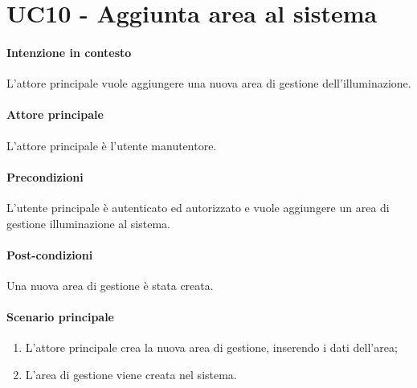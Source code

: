 \section{UC10 - Aggiunta area al sistema}\label{uc:10}
\paragraph{Intenzione in contesto} L'attore principale vuole aggiungere una nuova area di gestione dell'illuminazione.

\paragraph{Attore principale} L'attore principale è l'utente manutentore.

\paragraph{Precondizioni}
L'utente principale è autenticato ed autorizzato e vuole aggiungere un area di gestione illuminazione al sistema.

\paragraph{Post-condizioni}
Una nuova area di gestione è stata creata.

\paragraph{Scenario principale}
\begin{enumerate}
    \item L'attore principale crea la nuova area di gestione, inserendo i dati dell'area;
    \item L'area di gestione viene creata nel sistema.
\end{enumerate}
